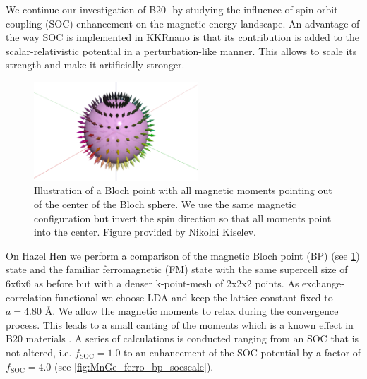 \documentclass[graybox]{svmult}
\begin{document}
We continue our investigation of B20- by studying the influence of spin-orbit
coupling (SOC) enhancement on the magnetic energy landscape.
An advantage of the way SOC is implemented in KKRnano is that
its contribution is added to the scalar-relativistic
potential in a perturbation-like manner. This allows to scale its strength and make it
artificially stronger.
\begin{figure}[htb]
	\sidecaption
	\includegraphics[width=0.55\textwidth]{Figures/blochpoint.png}
	\caption{Illustration of a Bloch point with all magnetic moments pointing out of
	the center of the Bloch sphere.
	We use the same magnetic configuration but invert the spin direction so that all moments point
	into the center. Figure provided by Nikolai Kiselev.}
	\label{fig:blochpoint}
\end{figure}
On Hazel Hen we perform a comparison of the magnetic Bloch point (BP) (see \cref{fig:blochpoint}) 
state and the familiar ferromagnetic (FM) state
with the same supercell size of 6x6x6 as before but with a denser k-point-mesh of 2x2x2 points.
As exchange-correlation functional we choose LDA and keep the lattice constant fixed to $a=4.80$ \AA.
We allow the magnetic moments to relax during the convergence process.
This leads to a small canting of the moments which is a known effect in
B20 materials \cite{chizhikov_multishell_2013}.
A series of calculations is conducted ranging from an SOC that is not altered, i.e. $f_{\text{SOC}}=1.0$ to
an enhancement of the SOC potential by a
factor of $f_{\text{SOC}}=4.0$ (see \cref{fig:MnGe_ferro_bp_socscale}).
\end{document}
